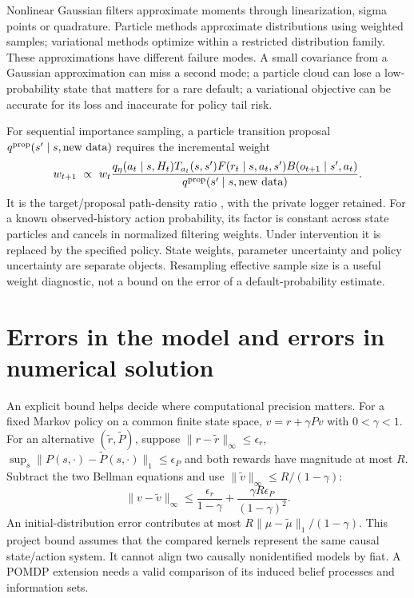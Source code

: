 Nonlinear Gaussian filters approximate moments through linearization,
sigma points or quadrature. Particle methods approximate distributions
using weighted samples; variational methods optimize within a restricted
distribution family. These approximations have different failure modes.
A small covariance from a Gaussian approximation can miss a second
mode; a particle cloud can lose a low-probability state that matters
for a rare default; a variational objective can be accurate for its
loss and inaccurate for policy tail risk.

For sequential importance sampling, a particle transition proposal
$q^{\rm prop}(s'\mid s,\text{new data})$ requires the incremental
weight
\[
 w_{t+1}\ \propto\ w_t
 \frac{q_\eta(a_t\mid s,H_t)T_{a_t}(s,s')
        F(r_t\mid s,a_t,s')B(o_{t+1}\mid s',a_t)}
      {q^{\rm prop}(s'\mid s,\text{new data})}.
\]
It is the target/proposal path-density ratio
\citep[Section 7.3]{sarkka2013}, with the private logger retained.
For a known observed-history action probability, its factor is constant
across state particles and cancels in normalized filtering weights.
Under intervention it is replaced by the specified policy. State weights,
parameter uncertainty and policy uncertainty are separate objects.
Resampling effective sample size is a useful weight diagnostic, not
a bound on the error of a default-probability estimate.

\section{Errors in the model and errors in numerical solution}
\label{r3:value-errors}
An explicit bound helps decide where computational precision matters.
For a fixed Markov policy on a common finite state space,
$v=r+\gamma Pv$ with $0<\gamma<1$.
For an alternative $(\widetilde r,\widetilde P)$, suppose
$\|r-\widetilde r\|_\infty\le\epsilon_r$,
$\sup_s\|P(s,\cdot)-\widetilde P(s,\cdot)\|_1\le\epsilon_P$
and both rewards have magnitude at most $R$. Subtract the two Bellman
equations and use $\|\widetilde v\|_\infty\le R/(1-\gamma)$:
\begin{equation}
 \|v-\widetilde v\|_\infty
 \le \frac{\epsilon_r}{1-\gamma}
     +\frac{\gamma R\epsilon_P}{(1-\gamma)^2}.
 \label{r3:simulation-bound}
\end{equation}
An initial-distribution error contributes at most
$R\|\mu-\widetilde\mu\|_1/(1-\gamma)$.
This project bound assumes that the compared kernels represent the
same causal state/action system. It cannot align two causally
nonidentified models by fiat. A POMDP extension needs a valid comparison
of its induced belief processes and information sets.

